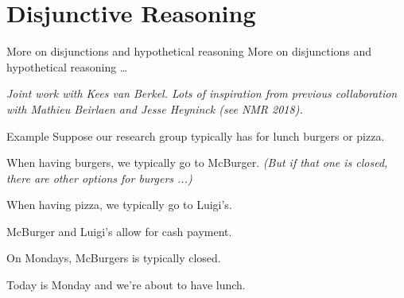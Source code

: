 \documentclass[aspectratio=169]{beamer}
\begin{document}
\section{Disjunctive Reasoning}
\label{sec:orgd76d5a1}

\begin{frame}[label={sec:orgb710fd7},standout]{More on disjunctions and hypothetical reasoning}
More on disjunctions and hypothetical reasoning \ldots{}

\vspace{2cm}

\emph{Joint work with \alert{Kees van Berkel}. Lots of inspiration from previous collaboration with \alert{Mathieu Beirlaen} and \alert{Jesse Heyninck} (see NMR 2018).}
\end{frame}

\begin{frame}{Example}
    Suppose our research group typically has for lunch burgers or pizza.  \pause

    When having burgers, we typically go to McBurger. {\it (But if that one is closed, there are other options for burgers ...)} \pause

    When having pizza, we typically go to Luigi's. \pause

    McBurger and Luigi's allow for cash payment. \pause

    On Mondays, McBurgers is typically closed. \pause 

    Today is Monday and we're about to have lunch.
\end{frame}
\end{document}
